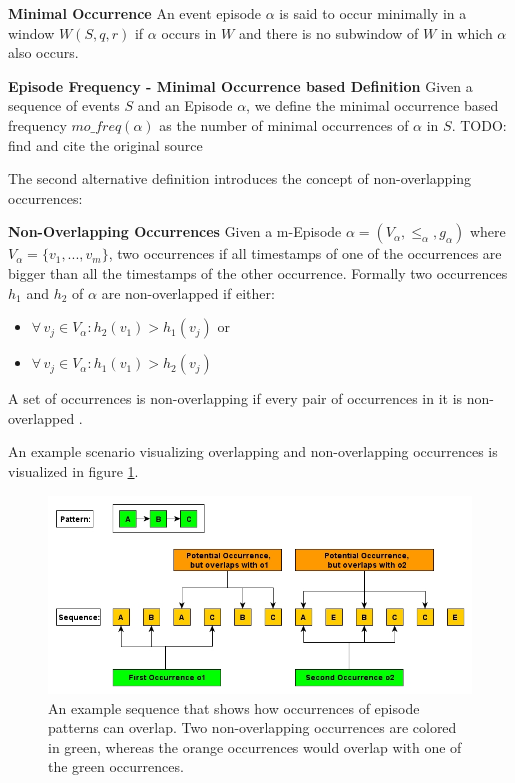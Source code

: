 \begin{mydef}
\textbf{Minimal Occurrence} An event episode $\alpha$ is said to occur minimally in a window $W(S,q,r)$ if $\alpha$ occurs in $W$ and there is no subwindow of $W$ in which $\alpha$ also occurs. %
\end{mydef}

\begin{mydef}
\label{def_minimalOccuranceFrequency}
\textbf{Episode Frequency - Minimal Occurrence based Definition} Given a sequence of events $S$ and an Episode $\alpha$, we define the minimal occurrence based frequency $mo\_freq(\alpha )$ as the number of minimal occurrences of $\alpha$ in $S$. TODO: find and cite the original source
\end{mydef}

The second alternative definition introduces the concept of non-overlapping occurrences:

\begin{mydef}
\textbf{Non-Overlapping Occurrences} Given a m-Episode $\alpha = (V_\alpha,{\leq}_{\alpha},g_\alpha)$ where $V_\alpha = \{v_1,...,v_m\}$, two occurrences if all timestamps of one of the occurrences are bigger than all the timestamps of the other occurrence. Formally two occurrences $h_1$ and $h_2$ of $\alpha$ are non-overlapped if either:
\begin{itemize}
	\item $\forall \, v_j \in V_\alpha : h_2(v_1)>h_1(v_j)$ or 
	\item $\forall \, v_j \in V_\alpha : h_1(v_1)>h_2(v_j)$
\end{itemize}
A set of occurrences is non-overlapping if every pair of occurrences in it is non-overlapped \cite{laxman2007fast}.
\end{mydef}

An example scenario visualizing overlapping and non-overlapping occurrences is visualized in figure \ref{fig_nonOverlappingExample}.


\begin{figure}[h]
	\centering
  	\includegraphics[width=\textwidth]{nonOverlappingExample}
	\caption{An example sequence that shows how occurrences of episode patterns can overlap. Two non-overlapping occurrences are colored in green, whereas the orange occurrences would overlap with one of the green occurrences.}
	\label{fig_nonOverlappingExample}
\end{figure}

